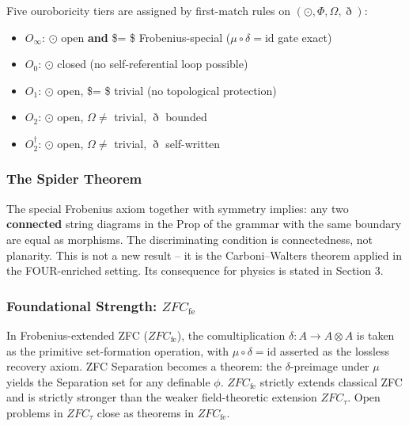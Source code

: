Five ouroboricity tiers are assigned by first-match rules on
\((\odot, \Phi, \Omega, \eth)\):

\begin{itemize}
\tightlist
\item
  \(O_\infty\): \(\odot\) open \textbf{and} \$\Phi = \$
  Frobenius-special (\(\mu \circ \delta = \mathrm{id}\) gate exact)
\item
  \(O_0\): \(\odot\) closed (no self-referential loop possible)
\item
  \(O_1\): \(\odot\) open, \$\Omega = \$ trivial (no topological
  protection)
\item
  \(O_2\): \(\odot\) open, \(\Omega \ne\) trivial, \(\eth\) bounded
\item
  \(O_2^\dagger\): \(\odot\) open, \(\Omega \ne\) trivial, \(\eth\)
  self-written
\end{itemize}

\hypertarget{the-spider-theorem}{%
\subsubsection{The Spider Theorem}\label{the-spider-theorem}}

The special Frobenius axiom together with symmetry implies: any two
\textbf{connected} string diagrams in the Prop of the grammar with the
same boundary are equal as morphisms. The discriminating condition is
connectedness, not planarity. This is not a new result -- it is the
Carboni--Walters theorem applied in the FOUR-enriched setting. Its
consequence for physics is stated in Section 3.

\hypertarget{foundational-strength-zfc_textfe}{%
\subsubsection{\texorpdfstring{Foundational Strength:
\(ZFC_\text{fe}\)}{Foundational Strength: ZFC\_\textbackslash text\{fe\}}}\label{foundational-strength-zfc_textfe}}

In Frobenius-extended ZFC (\(ZFC_\text{fe}\)), the comultiplication
\(\delta: A \to A \otimes A\) is taken as the primitive set-formation
operation, with \(\mu \circ \delta = \mathrm{id}\) asserted as the
lossless recovery axiom. ZFC Separation becomes a theorem: the
\(\delta\)-preimage under \(\mu\) yields the Separation set for any
definable \(\phi\). \(ZFC_\text{fe}\) strictly extends classical ZFC and
is strictly stronger than the weaker field-theoretic extension
\(ZFC_\tau\). Open problems in \(ZFC_\tau\) close as theorems in
\(ZFC_\text{fe}\).

